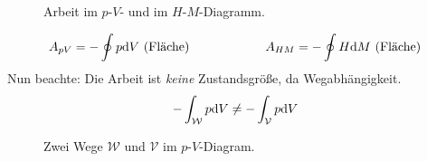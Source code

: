 \begin{enumerate}[a)]
       \begin{figure}[H]
        \centering
        \def\svgwidth{0.4\textwidth}
        
        \def\svgwidth{0.4\textwidth}
        
        \caption{Arbeit im $p$-$V$- und im $H$-$M$-Diagramm.}
        \label{img:notInfWork}
    \end{figure}
     
    \begin{equation}
        A_{pV} = - \oint p \mathrm{d} V \text{  (Fläche)} \qquad \qquad \qquad A_{HM} = - \oint H \mathrm{d} M \text{  (Fläche)}
    \end{equation}
    Nun beachte: Die Arbeit ist \emph{keine} Zustandsgröße, da Wegabhängigkeit.
    \begin{equation}
        - \int_\mathcal{W} p \mathrm{d} V \neq - \int_\mathcal{V} p \mathrm{d} V
    \end{equation}
    
        \begin{figure}[H]
        \centering
        \def\svgwidth{0.4\textwidth}
        
        \caption{Zwei Wege $\mathcal{W}$ und $\mathcal{V}$ im $p$-$V$-Diagram.}
        \label{img:pathsVW_in_p-V}
    \end{figure}
           

\end{enumerate}
